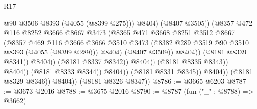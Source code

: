 \begin{lexlean}{R17}
\begin{coremodule}
                                                  @90
                                                  @3506
                                                  @8393
                                                  (@4055 (@8399 @275)))
                                                @8404)
                                              (@8407 @3505))
                                            (@8357
                                              @472
                                              @116
                                              @8252
                                              @3666
                                              @8667
                                              @3473
                                              (@8365
                                                @471
                                                @3668
                                                @8251
                                                @3512
                                                @8667
                                                (@8357
                                                  @469
                                                  @116
                                                  @3666
                                                  @3666
                                                  @3510
                                                  @3473
                                                  (@8382
                                                    @289
                                                    @3519
                                                    @90
                                                    @3510
                                                    @8393
                                                    (@4055 (@8399 @289)))
                                                  @8404)
                                                (@8407 @3509))
                                              @8404))
                                          (@8181 @8339 @8341))
                                        @8404))
                                    (@8181 @8337 @8342))
                                  @8404))
                              (@8181 @8335 @8343))
                            @8404))
                        (@8181 @8333 @8344))
                      @8404))
                  (@8181 @8331 @8345))
                @8404))
            (@8181 @8329 @8346))
          @8404))
      (@8181 @8326 @8347))
@8786 := @3665 @6203
@8787 := @3673 @2016
@8788 := @3675 @2016
@8790 := @8787 (fun ("_" : @8788) => @3662)

\end{coremodule}
\end{lexlean}

